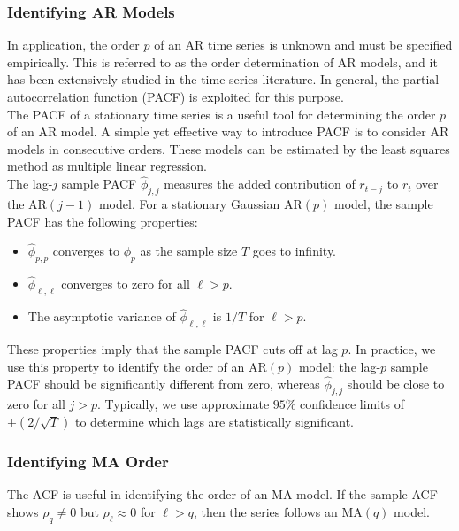 \subsubsection{Identifying AR Models}
In application, the order $p$ of an AR time series is unknown and must be specified empirically. This is referred to as the order determination of AR models, and it has been extensively studied in the time series literature.
In general, the partial autocorrelation function (PACF) is exploited for this purpose.\\
The PACF of a stationary time series is a useful tool for determining the order $p$ of an AR model. A simple yet effective way to introduce PACF is to consider AR models in consecutive orders. These models can be estimated by the least squares method as multiple linear regression. \\
The lag-$j$ sample PACF $\hat{\phi}_{j,j}$ measures the added contribution of $r_{t-j}$ to $r_t$ over the AR$(j-1)$ model. For a stationary Gaussian AR$(p)$ model, the sample PACF has the following properties:
\begin{itemize}
    \item $\hat{\phi}_{p,p}$ converges to $\phi_p$ as the sample size $T$ goes to infinity.
    \item $\hat{\phi}_{\ell,\ell}$ converges to zero for all $\ell > p$.
    \item The asymptotic variance of $\hat{\phi}_{\ell,\ell}$ is $1/T$ for $\ell > p$.
\end{itemize}

These properties imply that the sample PACF cuts off at lag $p$. In practice, we use this property to identify the order of an AR$(p)$ model: the lag-$p$ sample PACF should be significantly different from zero, whereas $\hat{\phi}_{j,j}$ should be close to zero for all $j > p$. Typically, we use approximate $95\%$ confidence limits of $\pm(2/\sqrt{T})$ to determine which lags are statistically significant.
\subsubsection{Identifying MA Order}
The ACF is useful in identifying the order of an MA model. If the sample ACF shows $\rho_q \neq 0$ but $\rho_\ell \approx 0$ for $\ell > q$, then the series follows an MA$(q)$ model.

